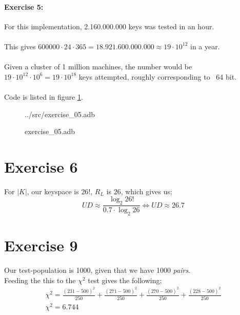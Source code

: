 \documentclass[10pt,a4paper]{article}
\begin{document}



\paragraph{Exercise 5:}

For this implementation, 2.160.000.000 keys was tested in an hour.\\\\
This gives $600000 \cdot 24 \cdot 365 = 18.921.600.000.000 \approx 19 \cdot 10^{12}$ in a year.\\\\
Given a cluster of 1 million machines, the number would be $19 \cdot 10^{12} \cdot 10^6 = 19 \cdot 10^{18}$ keys attempted, roughly corresponding to ~64 bit.\\\\
Code is listed in figure \ref{lst:exercise_05}.

\begin{figure}
 {../src/exercise_05.adb}
\caption{exercise\_05.adb}
\label{lst:exercise_05}
\end{figure}

\section*{Exercise 6}
For $|K|$, our keyspace is $26!$, $R_L$ is $26$, which gives us;
\begin{equation}
UD \approx \frac{\log_2{26!}}{0.7 \cdot \log_2{26}} \Leftrightarrow UD \approx 26.7
\end{equation}

\section*{Exercise 9}
Our test-population is 1000, given that we have 1000 \emph{pairs}.\\
Feeding the this to the $\chi^2$ test gives the following;
\begin{eqnarray}
\chi^2 = \frac{\left(231 - 500\right)^2}{250} + 
         \frac{\left(271 - 500\right)^2}{250} + 
         \frac{\left(270 - 500\right)^2}{250} + 
         \frac{\left(228 - 500\right)^2}{250} \\
\chi^2 = 6.744
\end{eqnarray}
\end{document}
